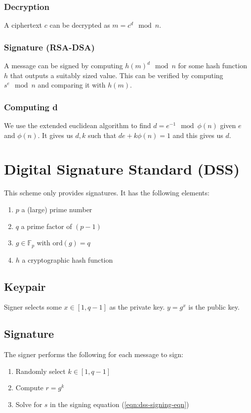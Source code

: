 \documentclass[11pt]{report}
\begin{document}
\subsubsection{Decryption}
A ciphertext $c$ can be decrypted as $m = c^d \mod{n}$.

\subsubsection{Signature (RSA-DSA)}
A message can be signed by computing $h(m)^d \mod{n}$ for some hash function $h$ that outputs a suitably sized value. This can be verified by computing $s^e \mod{n}$ and comparing it with $h(m)$.

\subsubsection{Computing d}
 We use the extended euclidean algorithm to find $d = e^{-1}\mod{\phi(n)}$ given $e$ and $\phi(n)$. It gives us $d, k$ such that $de + k\phi(n) = 1$ and this gives us $d$.

\section{Digital Signature Standard (DSS)}
This scheme only provides signatures. It has the following elements:

\begin{enumerate}
	\item $p$ a (large) prime number
	\item $q$ a prime factor of $(p-1)$
	\item $g \in \mathbb{F}_p$ with $\text{ord}(g) = q$
	\item $h$ a cryptographic hash function
\end{enumerate}


\subsection{Keypair}
Signer selects some $x \in [1, q-1]$ as the private key. $y = g^x$ is the public key.

\subsection{Signature}
The signer performs the following for each message to sign:

\begin{enumerate}
	\item Randomly select $k \in [1, q-1]$
	\item Compute $r = g^k$
	\item Solve for $s$ in the signing equation (\autoref{eqn:dss-signing-eqn})
\end{enumerate}
\end{document}
